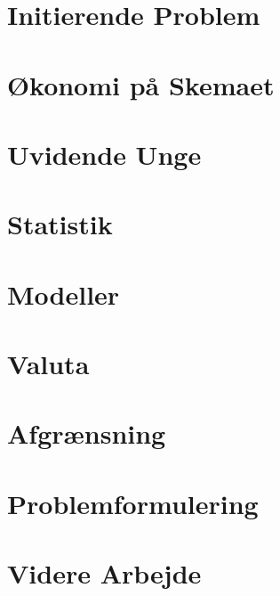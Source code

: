 


  \frame{\titlepage}
  
  \section{Initierende Problem}
  
  
  \section{Økonomi på Skemaet}
  
  
  \section{Uvidende Unge}
  
  
  \section{Statistik}
  
  
  \section{Modeller}
  
  
  \section{Valuta}
  
  
  \section{Afgrænsning}
  
  
  \section{Problemformulering}
  
  
  \section{Videre Arbejde}
  
  
  \closerslide{}
  
